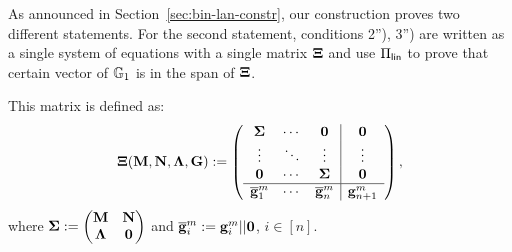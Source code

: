 As announced in Section~\ref{sec:bin-lan-constr}, our construction proves two different statements. For the second statement, conditions 2''), 3'') are written as a single system of equations with a single matrix $\mathbf{{\Xi}}$ and use $\Pi_{\mathsf{lin}}$ to prove that certain vector of $\mathbb{G}_1$ is in the span of $\mathbf{{\Xi}}$.

This matrix is defined as:
$$\mathbf{{\Xi}}(\mathbf{{M}},\mathbf{{N}},\mathbf{{\Lambda}},\mathbf{{G}}):=
\left(\begin{array}{ccc|ccc}
\mathbf{{\Sigma}}             & \cdots & \mathbf{{0}}                  & \mathbf{{0}} \\
\vdots                    & \ddots & \vdots                    & \vdots   \\
\mathbf{{0}}                  & \cdots & \mathbf{{\Sigma}}             & \mathbf{{0}} \\
\hline
\overline{\mathbf{g}}_1^{m} & \cdots & \overline{\mathbf{g}}_n^{m} & \mathbf{g}_{n+1}^{m}
\end{array}\right),
$$ where $\mathbf{{\Sigma}}:=\begin{pmatrix}
    \mathbf{{M}}       & \mathbf{{N}}\\
    \mathbf{{\Lambda}} & \mathbf{{0}}
\end{pmatrix}$ and
 $\overline{\mathbf{g}}_i^{m}:=\mathbf{g}_i^{m}||\mathbf{0}$, $i\in[n]$. 
 
